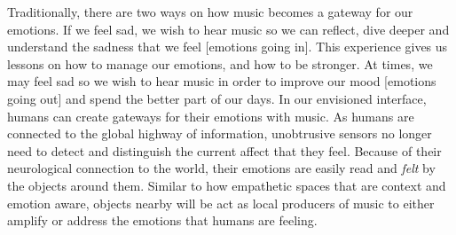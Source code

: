 \documentclass[sigchi]{acmart}
\begin{document}
Traditionally, there are two ways on how music becomes a gateway for our emotions. If we feel sad, we wish to hear music so we can reflect, dive deeper and understand the sadness that we feel [emotions going in]. This experience gives us lessons on how to manage our emotions, and how to be stronger. At times, we may feel sad so we wish to hear music in order to improve our mood [emotions going out] and spend the better part of our days. In our envisioned  interface, humans can create gateways for their emotions with music. As humans are connected to the global highway of information, unobtrusive sensors no longer need to detect and distinguish the current affect that they feel. Because of their neurological connection to the world, their emotions are easily read and \textit{felt} by the objects around them. Similar to how empathetic spaces that are context and emotion aware, objects nearby will be act as local producers of music to either amplify or address the emotions that humans are feeling. 
\end{document}
